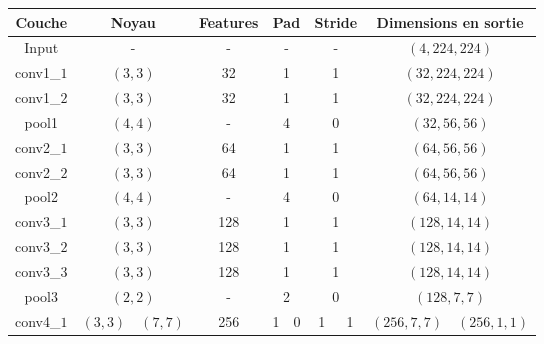 \documentclass[a4paper, 11pt]{report}
\begin{document}
\begin{tabular}{|c|c|c|c|c|c|c|c|c|c|c|}
\hline 
Couche & \multicolumn{2}{c|}{Noyau} & \multicolumn{2}{c|}{Features} & \multicolumn{2}{c|}{Pad} & \multicolumn{2}{c|}{Stride} & \multicolumn{2}{c|}{Dimensions en sortie}\\ 
\hline 
Input & \multicolumn{2}{c|}{-} & \multicolumn{2}{c|}{-} & \multicolumn{2}{c|}{-} & \multicolumn{2}{c|}{-} & \multicolumn{2}{c|}{$(4, 224, 224)$}\\ 
\hline 
conv1\_$1$ & \multicolumn{2}{c|}{$(3, 3)$} & \multicolumn{2}{c|}{32} & \multicolumn{2}{c|}{1} & \multicolumn{2}{c|}{1} & \multicolumn{2}{c|}{$(32, 224, 224)$}\\ 
\hline
conv1\_$2$ & \multicolumn{2}{c|}{$(3, 3)$} & \multicolumn{2}{c|}{32} & \multicolumn{2}{c|}{1} & \multicolumn{2}{c|}{1} & \multicolumn{2}{c|}{$(32, 224, 224)$}\\ 
\hline 
pool1 & \multicolumn{2}{c|}{$(4, 4)$} & \multicolumn{2}{c|}{-} & \multicolumn{2}{c|}{4} & \multicolumn{2}{c|}{0} & \multicolumn{2}{c|}{$(32, 56, 56)$}\\ 
\hline 
conv2\_$1$ & \multicolumn{2}{c|}{$(3, 3)$} & \multicolumn{2}{c|}{64} & \multicolumn{2}{c|}{1} & \multicolumn{2}{c|}{1} & \multicolumn{2}{c|}{$(64, 56, 56)$}\\ 
\hline
conv2\_$2$ & \multicolumn{2}{c|}{$(3, 3)$} & \multicolumn{2}{c|}{64} & \multicolumn{2}{c|}{1} & \multicolumn{2}{c|}{1} & \multicolumn{2}{c|}{$(64, 56, 56)$}\\ 
\hline 
pool2 & \multicolumn{2}{c|}{$(4, 4)$} & \multicolumn{2}{c|}{-} & \multicolumn{2}{c|}{4} & \multicolumn{2}{c|}{0} & \multicolumn{2}{c|}{$(64, 14, 14)$}\\ 
\hline 
conv3\_$1$ & \multicolumn{2}{c|}{$(3, 3)$} & \multicolumn{2}{c|}{128} & \multicolumn{2}{c|}{1} & \multicolumn{2}{c|}{1} & \multicolumn{2}{c|}{$(128, 14, 14)$}\\ 
\hline
conv3\_$2$ & \multicolumn{2}{c|}{$(3, 3)$} & \multicolumn{2}{c|}{128} & \multicolumn{2}{c|}{1} & \multicolumn{2}{c|}{1} & \multicolumn{2}{c|}{$(128, 14, 14)$}\\ 
\hline
conv3\_$3$ & \multicolumn{2}{c|}{$(3, 3)$} & \multicolumn{2}{c|}{128} & \multicolumn{2}{c|}{1} & \multicolumn{2}{c|}{1} & \multicolumn{2}{c|}{$(128, 14, 14)$}\\ 
\hline 
pool3 & \multicolumn{2}{c|}{$(2, 2)$} & \multicolumn{2}{c|}{-} & \multicolumn{2}{c|}{2} & \multicolumn{2}{c|}{0} & \multicolumn{2}{c|}{$(128, 7, 7)$}\\ 
\hline 
conv4\_$1$ & $(3,3)$ & $(7, 7)$ & \multicolumn{2}{c|}{256} & 1 & 0 & 1 & 1 & $(256, 7, 7)$ & $(256, 1, 1)$ \\

\end{tabular}
\end{document}
